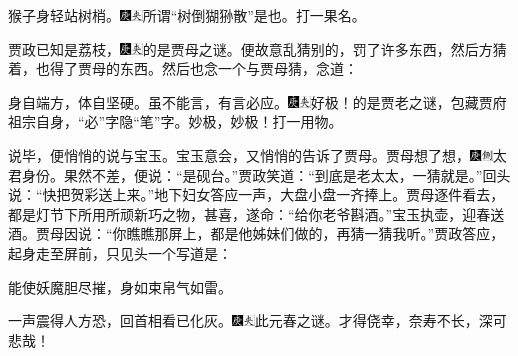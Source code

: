 猴子身轻站树梢。{\includegraphics[width=3mm]{../Images/00004}\includegraphics[width=3mm]{../Images/00012}\footnotesize \kaishu 所谓“树倒猢狲散”是也。}打一果名。

贾政已知是荔枝，{\includegraphics[width=3mm]{../Images/00004}\includegraphics[width=3mm]{../Images/00012}\footnotesize \kaishu 的是贾母之谜。}便故意乱猜别的，罚了许多东西，然后方猜着，也得了贾母的东西。然后也念一个与贾母猜，念道：

身自端方，体自坚硬。虽不能言，有言必应。{\includegraphics[width=3mm]{../Images/00004}\includegraphics[width=3mm]{../Images/00012}\footnotesize \kaishu 好极！的是贾老之谜，包藏贾府祖宗自身，“必”字隐“笔”字。妙极，妙极！}打一用物。

说毕，便悄悄的说与宝玉。宝玉意会，又悄悄的告诉了贾母。贾母想了想，{\includegraphics[width=3mm]{../Images/00004}\includegraphics[width=3mm]{../Images/00011}\footnotesize \kaishu 太君身份。}果然不差，便说：“是砚台。”贾政笑道：“到底是老太太，一猜就是。”回头说：“快把贺彩送上来。”地下妇女答应一声，大盘小盘一齐捧上。贾母逐件看去，都是灯节下所用所顽新巧之物，甚喜，遂命：“给你老爷斟酒。”宝玉执壶，迎春送酒。贾母因说：“你瞧瞧那屏上，都是他姊妹们做的，再猜一猜我听。”贾政答应，起身走至屏前，只见头一个写道是：

能使妖魔胆尽摧，身如束帛气如雷。

一声震得人方恐，回首相看已化灰。{\includegraphics[width=3mm]{../Images/00004}\includegraphics[width=3mm]{../Images/00012}\footnotesize \kaishu 此元春之谜。才得侥幸，奈寿不长，深可悲哉！}

